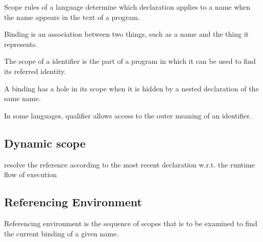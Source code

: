 \begin{definition}
    Scope rules of a language determine which declaration applies to a name when the name appears in the text of a program.
\end{definition}


\begin{definition}[Binding]
    Binding is an association between two things, such as a name and the thing it represents.
\end{definition}

\begin{definition}
    The scope of a identifier is the part of a program in which it can be used to find its referred identity.
\end{definition}

\begin{definition}
    A binding has a hole in its scope when it is hidden by a nested declaration of the same name.
\end{definition}

\begin{definition}[Qualifier]
    In some languages, qualifier allows access to the outer meaning of an identifier. 
\end{definition}


\subsection{Dynamic scope}

\begin{definition}
    resolve the reference according to the most recent declaration w.r.t. the runtime flow of execution
\end{definition}


\subsection{Referencing Environment}

\begin{definition}
    Referencing environment is the sequence of scopes that is to be examined to find the current binding of a given name.
\end{definition}


